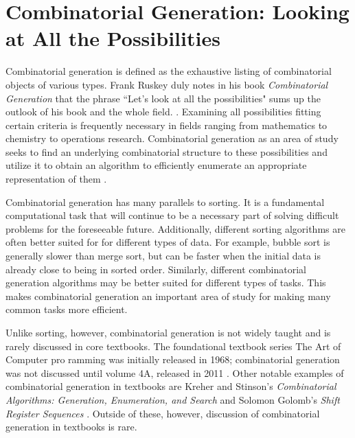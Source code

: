 \section{Combinatorial Generation: Looking at All the Possibilities}

Combinatorial generation is defined as the exhaustive listing of combinatorial objects of various types.  Frank Ruskey duly notes in his book \emph{Combinatorial Generation} that the phrase ``Let's look at all the possibilities" sums up the outlook of his book and the whole field. \cite{ruskey2003combinatorial}. Examining all possibilities fitting certain criteria is frequently necessary in fields ranging from mathematics to chemistry to operations research. Combinatorial generation as an area of study seeks to find an underlying combinatorial structure to these possibilities and utilize it to obtain an algorithm to efficiently enumerate an appropriate representation of them \cite{ruskey2003combinatorial}. 

Combinatorial generation has many parallels to sorting.  It is a fundamental computational task that will continue to be a necessary part of solving difficult problems for the foreseeable future.  Additionally, different sorting algorithms are often better suited for for different types of data.  For example, bubble sort is generally slower than merge sort, but can be faster when the initial data is already close to being in sorted order. Similarly, different combinatorial generation algorithms may be better suited for different types of tasks.  This makes combinatorial generation an important area of study for making many common tasks more efficient.  

Unlike sorting, however, combinatorial generation is not widely taught and is rarely discussed in core textbooks. The foundational textbook series The Art of Computer pro ramming was initially released in 1968; combinatorial generation was not discussed until volume 4A, released in 2011 \cite{knuth2015art}.  Other notable examples of combinatorial generation in textbooks are Kreher and Stinson's \emph{Combinatorial Algorithms: Generation, Enumeration, and Search} \cite{kreher2020combinatorial} and Solomon Golomb's \emph{Shift Register Sequences} \cite{golomb1967shift}. Outside of these, however, discussion of combinatorial generation in textbooks is rare.

